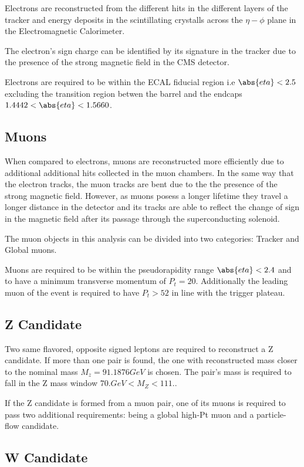 Electrons are reconstructed from the different hits in the different
layers of the tracker and energy deposits in the scintillating crystalls
across the $\eta-\phi$ plane in the Electromagnetic Calorimeter.

The electron's sign charge can be identified by its signature in the tracker
due to the presence of the strong magnetic field in the CMS detector.

Electrons are required to be within the ECAL fiducial region i.e
$\abs{eta}<2.5$ excluding the transition region betwen the barrel and
the endcaps $1.4442<\abs{eta}<1.5660$.

\subsection{Muons}

When compared to electrons, muons are reconstructed more efficiently due to additional
additional hits collected in the muon chambers.
In the same way that the electron tracks, the muon tracks are bent due to the
the presence of the strong magnetic field. However, as
muons posess a longer lifetime they travel a longer distance in the detector and
its tracks are able to reflect the change of sign in the magnetic field after
its passage through the superconducting solenoid.

The muon objects in this analysis can be divided into two categories:
Tracker and Global muons.

Muons are required to be within the pseudorapidity range $\abs{eta}<2.4$ and
to have a minimum transverse momentum of $P_t=20$. Additionally the leading muon of
the event is required to have $P_t>52$ in line with the trigger plateau.


\subsection{Z Candidate}

Two same flavored, opposite signed leptons are required to reconstruct a Z
candidate. If more than one pair is found, the one with reconstructed mass
closer to the nominal mass $M_z= 91.1876 GeV$ is chosen. The pair's mass
is required to fall in the Z mass window $ 70. GeV < M_Z < 111. $.

If the Z candidate is formed from a muon pair, one of its muons is required
to pass two additional requirements: being a global high-Pt muon and a
particle-flow candidate.

\subsection{W Candidate}

